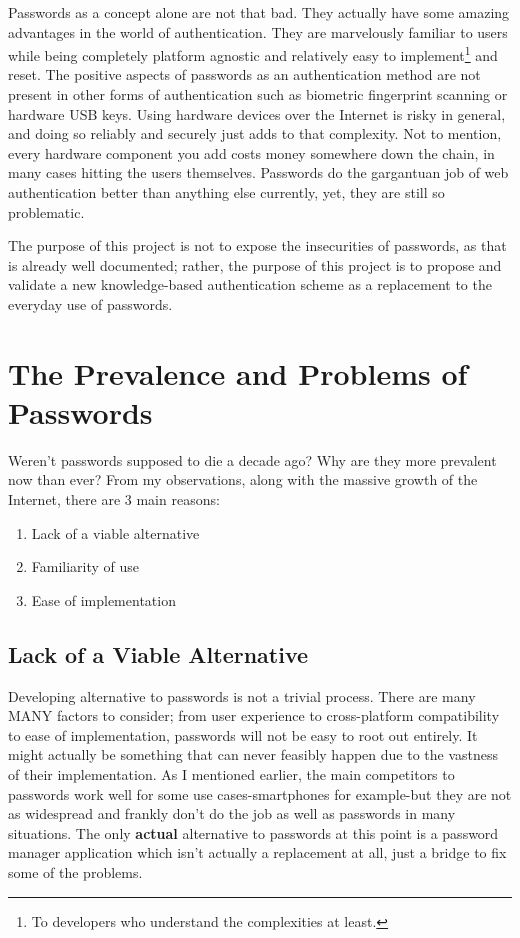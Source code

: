 \documentclass[conference]{IEEEtran}
\begin{document}
	Passwords as a concept alone are not that bad. They actually have some amazing advantages in the world of authentication. They are marvelously familiar to users while being completely platform agnostic and relatively easy to implement\footnote{To developers who understand the complexities at least.} and reset. The positive aspects of passwords as an authentication method are not present in other forms of authentication such as biometric fingerprint scanning or hardware USB keys. Using hardware devices over the Internet is risky in general, and doing so reliably and securely just adds to that complexity. Not to mention, every hardware component you add costs money somewhere down the chain, in many cases hitting the users themselves. Passwords do the gargantuan  job of web authentication better than anything else currently, yet, they are still so problematic.
	
	The purpose of this project is not to expose the insecurities of passwords, as that is already well documented\cite{Citation Needed}; rather, the purpose of this project is to propose and validate a new knowledge-based authentication scheme as a replacement to the everyday use of passwords.

\section{The Prevalence and Problems of Passwords}
	Weren't passwords supposed to die a decade ago\cite[Need to cite]{Citation Needed}? Why are they more prevalent now than ever\cite{Citation Needed}? From my observations, along with the massive growth of the Internet, there are 3 main reasons:
	\begin{enumerate}
		\item Lack of a viable alternative
		\item Familiarity of use
		\item Ease of implementation
	\end{enumerate}
\subsection{Lack of a Viable Alternative}
	Developing alternative to passwords is not a trivial process. There are many MANY factors to consider\cite{Citation Needed}; from user experience to cross-platform compatibility to ease of implementation, passwords will not be easy to root out entirely. It might actually be something that can never feasibly happen due to the vastness of their implementation. As I mentioned earlier, the main competitors to passwords work well for some use cases-smartphones for example-but they are not as widespread and frankly don't do the job as well as passwords in many situations. The only \textbf{actual} alternative to passwords at this point is a password manager application which isn't actually a replacement at all, just a bridge to fix some of the problems.
\end{document}
